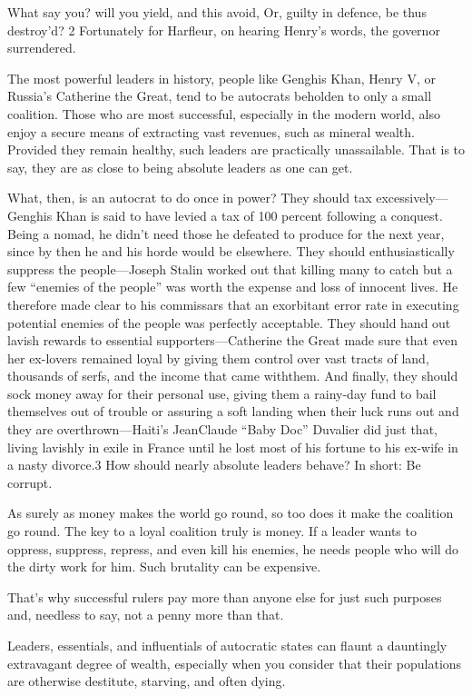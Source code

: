 \documentclass[10pt]{article}
\begin{document}
{\large What say you? will you yield, and this avoid, Or, guilty in defence, be
thus destroy'd? 2 Fortunately for Harfleur, on hearing Henry's words, the
governor surrendered.}

{\large The most powerful leaders in history, people like Genghis Khan, Henry V,
or Russia's Catherine the Great, tend to be autocrats beholden to only a small
coalition. Those who are most successful, especially in the modern world, also
enjoy a secure means of extracting vast revenues, such as mineral wealth.
Provided they remain healthy, such leaders are practically unassailable. That is
to say, they are as close to being absolute leaders as one can get.}

{\large What, then, is an autocrat to do once in power? They should tax
excessively---Genghis Khan is said to have levied a tax of 100 percent following
a conquest. Being a nomad, he didn't need those he defeated to produce for the
next year, since by then he and his horde would be elsewhere. They should
enthusiastically suppress the people---Joseph Stalin worked out that killing many
to catch but a few ``enemies of the people'' was worth the expense and loss of
innocent lives. He therefore made clear to his commissars that an exorbitant
error rate in executing potential enemies of the people was perfectly acceptable.
They should hand out lavish rewards to essential supporters---Catherine the Great
made sure that even her ex-lovers remained loyal by giving them control over vast
tracts of land, thousands of serfs, and the income that came withthem. And
finally, they should sock money away for their personal use, giving them a
rainy-day fund to bail themselves out of trouble or assuring a soft landing when
their luck runs out and they are overthrown---Haiti's JeanClaude ``Baby Doc''
Duvalier did just that, living lavishly in exile in France until he lost most of
his fortune to his ex-wife in a nasty divorce.3 How should nearly absolute
leaders behave? In short: Be corrupt.}

{\large As surely as money makes the world go round, so too does it make the
coalition go round. The key to a loyal coalition truly is money. If a leader
wants to oppress, suppress, repress, and even kill his enemies, he needs people
who will do the dirty work for him. Such brutality can be expensive.}

{\large That's why successful rulers pay more than anyone else for just such
purposes and, needless to say, not a penny more than that.}

{\large Leaders, essentials, and influentials of autocratic states can flaunt a
dauntingly extravagant degree of wealth, especially when you consider that their
populations are otherwise destitute, starving, and often dying.}
\end{document}

